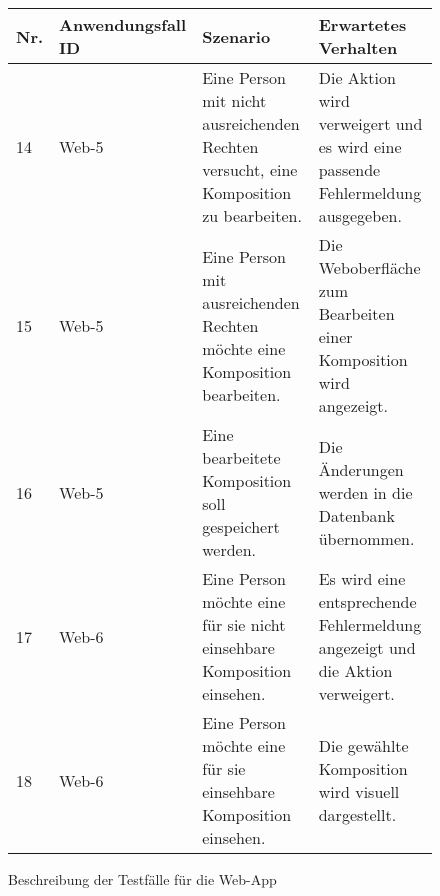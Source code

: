\newpage
\begin{figure}[!h]
	\begin{center}
	\begin{tabularx}{\textwidth}{ p{} | p{} | X | X }
		\textbf{Nr.} & \textbf{Anwendungsfall ID} & \textbf{Szenario} & \textbf{Erwartetes Verhalten} \\ \hline


			14 & Web-5 & Eine Person mit nicht ausreichenden Rechten versucht, eine Komposition zu bearbeiten. & Die Aktion wird verweigert und es wird eine passende Fehlermeldung ausgegeben. \\ \hline
			15 & Web-5 & Eine Person mit ausreichenden Rechten möchte eine Komposition bearbeiten. & Die Weboberfläche zum Bearbeiten einer Komposition wird angezeigt. \\ \hline
			16 & Web-5 & Eine bearbeitete Komposition soll gespeichert werden. & Die Änderungen werden in die Datenbank übernommen. \\ \hline
			17 & Web-6 & Eine Person möchte eine für sie nicht einsehbare Komposition einsehen. & Es wird eine entsprechende Fehlermeldung angezeigt und die Aktion verweigert. \\ \hline
			18 & Web-6 & Eine Person möchte eine für sie einsehbare Komposition einsehen. & Die gewählte Komposition wird visuell dargestellt. \\ \hline
			
		\end{tabularx}	

	\end{center}
	

	\caption{Beschreibung der Testfälle für die Web-App}
	\label{fig:testfaelle-webapp-b}
\end{figure}

